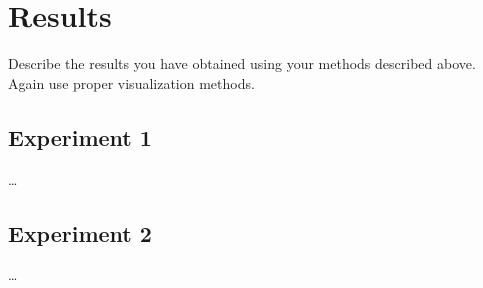 \section{Results}

Describe the results you have obtained using your methods described above. Again use proper visualization methods.

\subsection{Experiment 1}

\dots

\subsection{Experiment 2}

\dots